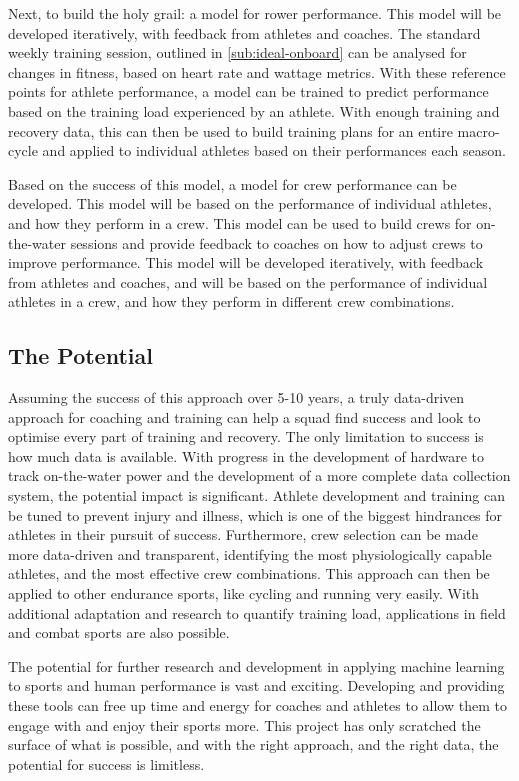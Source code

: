 Next, to build the holy grail: a model for rower performance. This model will be developed iteratively, with feedback from athletes and coaches. The standard weekly training session, outlined in \autoref{sub:ideal-onboard} can be analysed for changes in fitness, based on heart rate and wattage metrics. With these reference points for athlete performance, a model can be trained to predict performance based on the training load experienced by an athlete. With enough training and recovery data, this can then be used to build training plans for an entire macro-cycle and applied to individual athletes based on their performances each season. 

Based on the success of this model, a model for crew performance can be developed. This model will be based on the performance of individual athletes, and how they perform in a crew. This model can be used to build crews for on-the-water sessions and provide feedback to coaches on how to adjust crews to improve performance. This model will be developed iteratively, with feedback from athletes and coaches, and will be based on the performance of individual athletes in a crew, and how they perform in different crew combinations.

\subsection{The Potential}
Assuming the success of this approach over 5-10 years, a truly data-driven approach for coaching and training can help a squad find success and look to optimise every part of training and recovery. The only limitation to success is how much data is available. With progress in the development of hardware to track on-the-water power and the development of a more complete data collection system, the potential impact is significant. Athlete development and training can be tuned to prevent injury and illness, which is one of the biggest hindrances for athletes in their pursuit of success. Furthermore, crew selection can be made more data-driven and transparent, identifying the most physiologically capable athletes, and the most effective crew combinations. This approach can then be applied to other endurance sports, like cycling and running very easily. With additional adaptation and research to quantify training load, applications in field and combat sports are also possible.

The potential for further research and development in applying machine learning to sports and human performance is vast and exciting. Developing and providing these tools can free up time and energy for coaches and athletes to allow them to engage with and enjoy their sports more. This project has only scratched the surface of what is possible, and with the right approach, and the right data, the potential for success is limitless.

